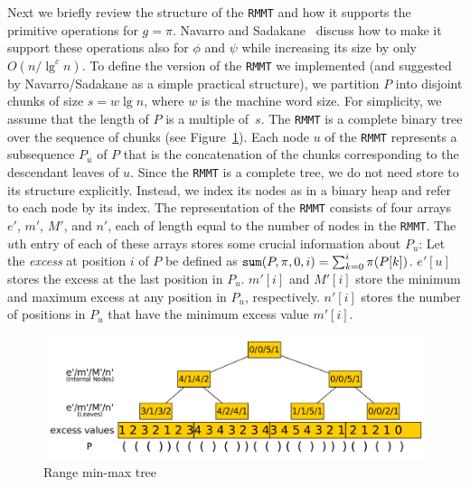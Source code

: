 Next we briefly review the structure of the {\tt RMMT} and how it supports
the primitive operations for $g = \pi$.
Navarro and Sadakane~\cite{Navarro:2014:FFS:2620785.2601073} discuss how
to make it support these operations also for $\phi$ and $\psi$ while increasing
its size by only $O(n/\lg^c n)$.
To define the version of the {\tt RMMT} we implemented (and suggested by
Navarro/Sadakane as a simple practical structure), we partition $P$ into
disjoint chunks of size $s = w \lg n$, where $w$ is the machine word size.
For simplicity, we assume that the length of $P$ is a multiple of~$s$.
The {\tt RMMT} is a complete binary tree over the sequence of chunks
(see Figure~\ref{fig:RangeMinMaxTree}).
Each node $u$ of the {\tt RMMT} represents a subsequence $P_u$ of $P$ that is
the concatenation of the chunks corresponding to the descendant leaves of $u$.
Since the {\tt RMMT} is a complete tree, we do not need store to its structure
explicitly.
Instead, we index its nodes as in a binary heap and refer to each node by
its index.
The representation of the {\tt RMMT} consists of four arrays $e'$, $m'$,
$M'$, and $n'$, each of length equal to the number of nodes in the {\tt RMMT}.
The $u$th entry of each of these arrays stores some crucial information about
$P_u$:
Let the {\em excess} at position $i$ of $P$ be defined as $\mathtt{sum}(P,\pi,0,i) =
\sum_{k=0}^{i} \pi(P[k])$.
$e'[u]$ stores the excess at the last position in $P_u$.
$m'[i]$ and $M'[i]$ store the minimum and maximum excess at any position in
$P_u$, respectively.
$n'[i]$ stores the number of positions in $P_u$ that have the minimum excess
value $m'[i]$.

\begin{figure}[t]
  \centering
  \includegraphics[scale=0.26]{./images/Range-min-max-tree.png}
  \caption{Range min-max tree}
  \label{fig:RangeMinMaxTree}
\end{figure}

